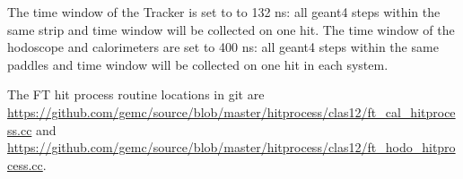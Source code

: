 \noindent The time window  of the Tracker is set to to 132 ns: all geant4 steps within the same strip and time window will be collected on one hit.
The time window of the hodoscope and calorimeters are set to 400 ns: all geant4 steps within the same paddles and time window
will be collected on one hit in each system.

The FT hit process routine locations in git are \url{https://github.com/gemc/source/blob/master/hitprocess/clas12/ft_cal_hitprocess.cc} and
\url{https://github.com/gemc/source/blob/master/hitprocess/clas12/ft_hodo_hitprocess.cc}.

